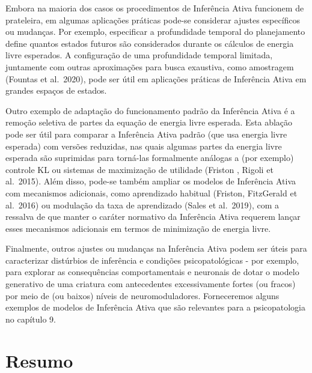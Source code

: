 \documentclass[
  12pt,
]{book}
\begin{document}
Embora na maioria dos casos os procedimentos de Inferência Ativa funcionem de prateleira, em algumas aplicações práticas pode-se considerar ajustes específicos ou mudanças. Por exemplo, especificar a profundidade temporal do planejamento define quantos estados futuros são considerados durante os cálculos de energia livre esperados. A configuração de uma profundidade temporal limitada, juntamente com outras aproximações para busca exaustiva, como amostragem (Fountas et al.~2020), pode ser útil em aplicações práticas de Inferência Ativa em grandes espaços de estados.

Outro exemplo de adaptação do funcionamento padrão da Inferência Ativa é a remoção seletiva de partes da equação de energia livre esperada. Esta ablação pode ser útil para comparar a Inferência Ativa padrão (que usa energia livre esperada) com versões reduzidas, nas quais algumas partes da energia livre esperada são suprimidas para torná-las formalmente análogas a (por exemplo) controle KL ou sistemas de maximização de utilidade (Friston , Rigoli et al.~2015). Além disso, pode-se também ampliar os modelos de Inferência Ativa com mecanismos adicionais, como aprendizado habitual (Friston, FitzGerald et al.~2016) ou modulação da taxa de aprendizado (Sales et al.~2019), com a ressalva de que manter o caráter normativo da Inferência Ativa requerem lançar esses mecanismos adicionais em termos de minimização de energia livre.

Finalmente, outros ajustes ou mudanças na Inferência Ativa podem ser úteis para caracterizar distúrbios de inferência e condições psicopatológicas - por exemplo, para explorar as consequências comportamentais e neuronais de dotar o modelo generativo de uma criatura com antecedentes excessivamente fortes (ou fracos) por meio de (ou baixos) níveis de neuromoduladores. Forneceremos alguns exemplos de modelos de Inferência Ativa que são relevantes para a psicopatologia no capítulo 9.

\hypertarget{resumo-5}{%
\section{Resumo}\label{resumo-5}}
\end{document}
